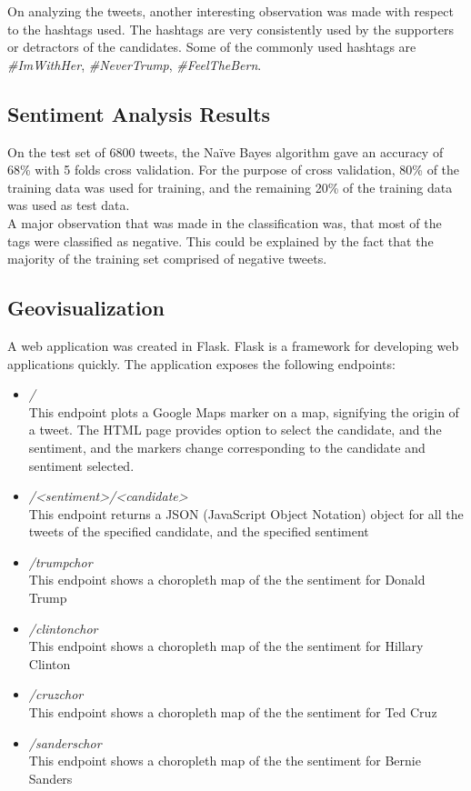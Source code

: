 \documentclass[twoside]{article}
\begin{document}
\begin{multicols}{2}
On analyzing the tweets, another interesting observation was made with respect to the hashtags used. The hashtags are very consistently used by the supporters or detractors of the candidates. Some of the commonly used hashtags are \textit{\#ImWithHer}, \textit{\#NeverTrump}, \textit{\#FeelTheBern}.

\subsection{Sentiment Analysis Results}
On the test set of 6800 tweets, the Na\"ive Bayes algorithm gave an accuracy of 68\% with 5 folds cross validation. For the purpose of cross validation, 80\% of the training data was used for training, and the remaining 20\% of the training data was used as test data. \\
A major observation that was made in the classification was, that most of the tags were classified as negative. This could be explained by the fact that the majority of the training set comprised of negative tweets.

\subsection{Geovisualization}
A web application was created in Flask\cite{flask}. Flask is a framework for developing web applications quickly. The application exposes the following endpoints: \\
\begin{itemize}
\item
\textit{/} \\
This endpoint plots a Google Maps marker on a map, signifying the origin of a tweet. The HTML page provides option to select the candidate, and the sentiment, and the markers change corresponding to the candidate and sentiment selected.
\item
\textit{/<sentiment>/<candidate>} \\
This endpoint returns a JSON (JavaScript Object Notation) object for all the tweets of the specified candidate, and the specified sentiment
\item
\textit{/trumpchor} \\
This endpoint shows a choropleth map of the the sentiment for Donald Trump
\item
\textit{/clintonchor} \\
This endpoint shows a choropleth map of the the sentiment for Hillary Clinton
\item
\textit{/cruzchor} \\
This endpoint shows a choropleth map of the the sentiment for Ted Cruz
\item
\textit{/sanderschor} \\
This endpoint shows a choropleth map of the the sentiment for Bernie Sanders
\end{itemize}


\end{multicols}
\end{document}
